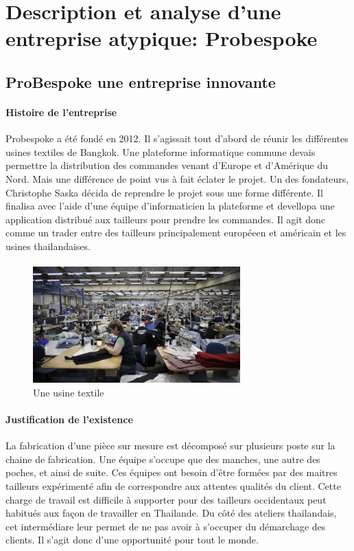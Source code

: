 \section{Description et analyse d'une entreprise atypique: Probespoke}
\subsection{ProBespoke une entreprise innovante}

\paragraph{Histoire de l'entreprise}
Probespoke a été fondé en 2012. Il s'agissait tout d'abord de réunir les différentes usines textiles de Bangkok.
Une plateforme informatique commune devais permettre la distribution des commandes venant d'Europe et d'Amérique du Nord.
Mais une différence de point vus à fait éclater le projet. Un des fondateurs, Christophe Saska décida de reprendre le projet sous une forme différente. Il finalisa avec l'aide d'une équipe d'informaticien la plateforme et devellopa une application distribué aux tailleurs pour prendre les commandes. Il agit donc comme un trader entre des tailleurs principalement européeen et américain et les usines thailandaises.
\paragraph{}

\paragraph{}
\clearpage
\begin{figure}
\includegraphics[width=8cm]{image/textile.jpg}
\caption{Une usine textile}
\end{figure}
\paragraph{Justification de l'existence}
 La fabrication d'une pièce sur mesure est décomposé sur plusieurs poste sur la chaine de fabrication. Une équipe s'occupe que des manches, une autre des poches, et ainsi de suite. Ces équipes ont besoin d'être formées par des maitres tailleurs expérimenté afin de correspondre aux attentes qualités du client. Cette charge de travail est difficile à supporter pour des tailleurs occidentaux peut habitués aux façon de travailler en Thailande. Du côté des ateliers thailandais, cet intermédiare leur permet de ne pas avoir à s'occuper du démarchage des clients. Il s'agit donc d'une opportunité pour tout le monde.
